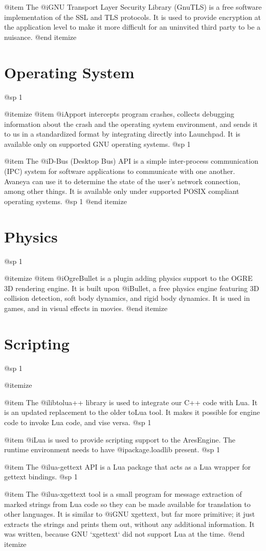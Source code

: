 @item
The @i{GNU Transport Layer Security Library} (GnuTLS) is a free software implementation of the SSL and TLS protocols. It is used to provide encryption at the application level to make it more difficult for an uninvited third party to be a nuisance.
@end itemize

\section{Operating System}
@sp 1

@itemize
@item
@i{Apport} intercepts program crashes, collects debugging information about the crash and the operating system environment, and sends it to us in a standardized format by integrating directly into Launchpad. It is available only on supported GNU operating systems.
@sp 1

@item
The @i{D-Bus} (Desktop Bus) API is a simple inter-process communication (IPC) system for software applications to communicate with one another. Avaneya can use it to determine the state of the user's network connection, among other things. It is available only under supported POSIX compliant operating systems.
@sp 1
@end itemize

\section{Physics}
@sp 1

@itemize
@item
@i{OgreBullet} is a plugin adding physics support to the OGRE 3D rendering engine. It is built upon @i{Bullet}, a free physics engine featuring 3D collision detection, soft body dynamics, and rigid body dynamics. It is used in games, and in visual effects in movies.
@end itemize


\section{Scripting}
@sp 1

@itemize

@item
The @i{libtolua++} library is used to integrate our C++ code with Lua. It is an updated replacement to the older toLua tool. It makes it possible for engine code to invoke Lua code, and vise versa.
@sp 1

@item
@i{Lua} is used to provide scripting support to the AresEngine. The runtime environment needs to have @i{package.loadlib} present.
@sp 1

@item
The @i{lua-gettext} API is a Lua package that acts as a Lua wrapper for gettext bindings.
@sp 1

@item
The @i{lua-xgettext} tool is a small program for message extraction of marked strings from Lua code so they can be made available for translation to other languages. It is similar to @i{GNU xgettext}, but far more primitive; it just extracts the strings and prints them out, without any additional information. It was written, because GNU `xgettext` did not support Lua at the time.
@end itemize


